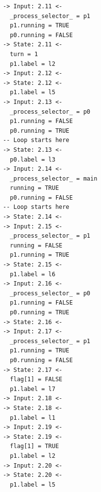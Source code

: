 \documentclass[12pt]{article}
\begin{document}
\begin{verbatim}
-> Input: 2.11 <-
  _process_selector_ = p1
  p1.running = TRUE
  p0.running = FALSE
-> State: 2.11 <-
  turn = 1
  p1.label = l2
-> Input: 2.12 <-
-> State: 2.12 <-
  p1.label = l5
-> Input: 2.13 <-
  _process_selector_ = p0
  p1.running = FALSE
  p0.running = TRUE
-- Loop starts here
-> State: 2.13 <-
  p0.label = l3
-> Input: 2.14 <-
  _process_selector_ = main
  running = TRUE
  p0.running = FALSE
-- Loop starts here
-> State: 2.14 <-
-> Input: 2.15 <-
  _process_selector_ = p1
  running = FALSE
  p1.running = TRUE
-> State: 2.15 <-
  p1.label = l6
-> Input: 2.16 <-
  _process_selector_ = p0
  p1.running = FALSE
  p0.running = TRUE
-> State: 2.16 <-
-> Input: 2.17 <-
  _process_selector_ = p1
  p1.running = TRUE
  p0.running = FALSE
-> State: 2.17 <-
  flag[1] = FALSE
  p1.label = l7
-> Input: 2.18 <-
-> State: 2.18 <-
  p1.label = l1
-> Input: 2.19 <-
-> State: 2.19 <-
  flag[1] = TRUE
  p1.label = l2
-> Input: 2.20 <-
-> State: 2.20 <-
  p1.label = l5
\end{verbatim}
\end{document}
